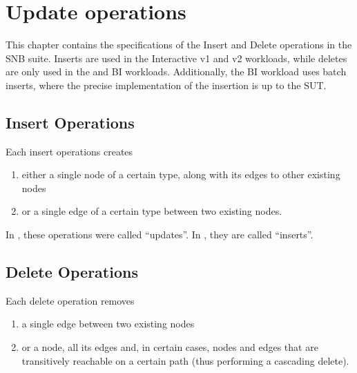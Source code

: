 \chapter{Update operations}
\label{sec:update-operations}

This chapter contains the specifications of the Insert and Delete operations in the SNB suite. Inserts are used in the Interactive v1 and v2 workloads, while deletes are only used in the \interactivevtwo and BI workloads. Additionally, the BI workload uses batch inserts, where the precise implementation of the insertion is up to the SUT.

\section{Insert Operations}
\label{sec:insert-operations}

Each insert operations creates

\begin{enumerate}
    \item either a single node of a certain type, along with its edges to other existing nodes
    \item or a single edge of a certain type between two existing nodes.
\end{enumerate}
In \interactivevone, these operations were called ``updates''.
In \interactivevtwo, they are called ``inserts''.



\section{Delete Operations}
\label{sec:delete-operations}

Each delete operation removes

\begin{enumerate}
    \item a single edge between two existing nodes
    \item or a node, all its edges and, in certain cases, nodes and edges that are transitively reachable on a certain path (thus performing a cascading delete).
\end{enumerate}


